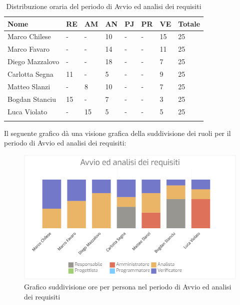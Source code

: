 \begin{longtable}{|C{.30\textwidth}|C{.06\textwidth}|C{.06\textwidth}|C{.06\textwidth} | C{.06\textwidth}| C{.06\textwidth} | C{.06\textwidth} | C{.10\textwidth} |}
\hline
\textbf{Nome} & \textbf{RE} & \textbf{AM} & \textbf{AN} & \textbf{PJ} & \textbf{PR} & \textbf{VE} & \textbf{Totale}\\
\hline 
Marco Chilese & - & - & 10 & - & - & 15 & 25 \\
\hline
Marco Favaro & - & - & 14 & - & - & 11 & 25 \\
\hline
Diego Mazzalovo & - & - & 18 & - & - & 7 & 25 \\
\hline
Carlotta Segna & 11 & - & 5 & - & - & 9 & 25 \\
\hline
Matteo Slanzi & - & 8 & 10 & - & - & 7 & 25 \\
\hline
Bogdan Stanciu & 15 & - & 7 & - & - & 3 & 25\\
\hline
Luca Violato & - & 15 & 5 & - & - & 5 & 25 \\
\hline


\caption{Distribuzione oraria del periodo di Avvio ed analisi dei requisiti}
\label{Distribuzione oraria del periodo di Avvio ed analisi dei requisiti}
\end{longtable}

Il seguente grafico dà una visione grafica della suddivisione dei ruoli per il periodo di Avvio ed analisi dei requisiti:

\begin{figure}[h]
	\centering
  		\includegraphics[width=1\linewidth]{./images/avvio_analisi_requisiti.png}
  		\caption{Grafico suddivisione ore per persona nel periodo di Avvio ed analisi dei requisiti}
  		\label{fig:grafico suddivione ruoli periodo di Avvio ed analisi requisiti}
\end{figure}



